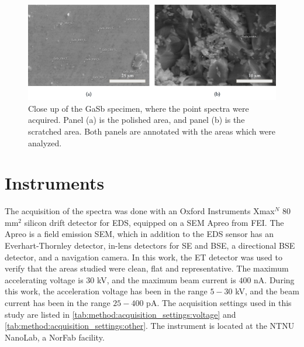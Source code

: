 \begin{figure}[htbp]
    \centering
    \includegraphics[width=.99\textwidth]{figures/SE_images/GaSb_close.jpg}
    \caption{
        Close up of the GaSb specimen, where the point spectra were acquired.
        Panel (a) is the polished area, and panel (b) is the scratched area.
        Both panels are annotated with the areas which were analyzed.
    }
    \label{fig:SE_images:GaSb}
\end{figure}


















\section{Instruments}
\label{method:instruments}

The acquisition of the spectra was done with an Oxford Instruments Xmax$^N$ $80$ mm$^2$ silicon drift detector for EDS, equipped on a SEM Apreo from FEI.
The Apreo is a field emission SEM, which in addition to the EDS sensor has an Everhart-Thornley detector, in-lens detectors for SE and BSE, a directional BSE detector, and a navigation camera.
In this work, the ET detector was used to verify that the areas studied were clean, flat and representative.
The maximum accelerating voltage is $30$ kV, and the maximum beam current is $400$ nA.
During this work, the acceleration voltage has been in the range $5-30$ kV, and the beam current has been in the range $25-400$ pA.
The acquisition settings used in this study are listed in \cref{tab:method:acquisition_settings:voltage} and \cref{tab:method:acquisition_settings:other}.
The instrument is located at the NTNU NanoLab, a NorFab facility.


